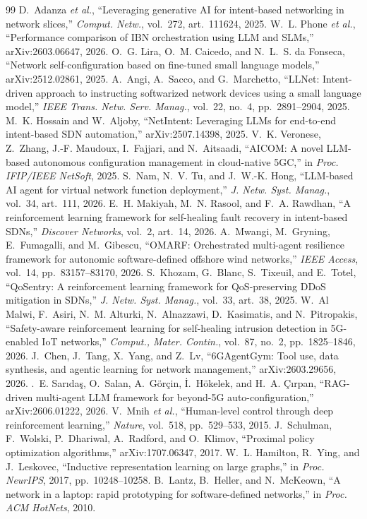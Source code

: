 \documentclass[sn-mathphys,Numbered]{sn-jnl}
\begin{document}
\begin{thebibliography}{99}
D.~Adanza \emph{et al.}, ``Leveraging generative AI for intent-based networking in network slices,'' \emph{Comput. Netw.}, vol.~272, art.~111624, 2025.
W.~L. Phone \emph{et al.}, ``Performance comparison of IBN orchestration using LLM and SLMs,'' arXiv:2603.06647, 2026.
O.~G. Lira, O.~M. Caicedo, and N.~L.~S. da Fonseca, ``Network self-configuration based on fine-tuned small language models,'' arXiv:2512.02861, 2025.
A.~Angi, A.~Sacco, and G.~Marchetto, ``LLNet: Intent-driven approach to instructing softwarized network devices using a small language model,'' \emph{IEEE Trans. Netw. Serv. Manag.}, vol.~22, no.~4, pp.~2891--2904, 2025.
M.~K. Hossain and W.~Aljoby, ``NetIntent: Leveraging LLMs for end-to-end intent-based SDN automation,'' arXiv:2507.14398, 2025.
V.~K. Veronese, Z.~Zhang, J.-F. Maudoux, I.~Fajjari, and N.~Aitsaadi, ``AICOM: A novel LLM-based autonomous configuration management in cloud-native 5GC,'' in \emph{Proc. IFIP/IEEE NetSoft}, 2025.
S.~Nam, N.~V. Tu, and J.~W.-K. Hong, ``LLM-based AI agent for virtual network function deployment,'' \emph{J. Netw. Syst. Manag.}, vol.~34, art.~111, 2026.
E.~H. Makiyah, M.~N. Rasool, and F.~A. Rawdhan, ``A reinforcement learning framework for self-healing fault recovery in intent-based SDNs,'' \emph{Discover Networks}, vol.~2, art.~14, 2026.
A.~Mwangi, M.~Gryning, E.~Fumagalli, and M.~Gibescu, ``OMARF: Orchestrated multi-agent resilience framework for autonomic software-defined offshore wind networks,'' \emph{IEEE Access}, vol.~14, pp.~83157--83170, 2026.
S.~Khozam, G.~Blanc, S.~Tixeuil, and E.~Totel, ``QoSentry: A reinforcement learning framework for QoS-preserving DDoS mitigation in SDNs,'' \emph{J. Netw. Syst. Manag.}, vol.~33, art.~38, 2025.
W.~Al Malwi, F.~Asiri, N.~M. Alturki, N.~Alnazzawi, D.~Kasimatis, and N.~Pitropakis, ``Safety-aware reinforcement learning for self-healing intrusion detection in 5G-enabled IoT networks,'' \emph{Comput., Mater. Contin.}, vol.~87, no.~2, pp.~1825--1846, 2026.
J.~Chen, J.~Tang, X.~Yang, and Z.~Lv, ``6GAgentGym: Tool use, data synthesis, and agentic learning for network management,'' arXiv:2603.29656, 2026.
.~E. Sar{\i}da{\c{s}}, O.~Salan, A.~G\"{o}r\c{c}in, {\.I}.~H\"{o}kelek, and H.~A. \c{C}{\i}rpan, ``RAG-driven multi-agent LLM framework for beyond-5G auto-configuration,'' arXiv:2606.01222, 2026.
V.~Mnih \emph{et al.}, ``Human-level control through deep reinforcement learning,'' \emph{Nature}, vol.~518, pp.~529--533, 2015.
J.~Schulman, F.~Wolski, P.~Dhariwal, A.~Radford, and O.~Klimov, ``Proximal policy optimization algorithms,'' arXiv:1707.06347, 2017.
W.~L. Hamilton, R.~Ying, and J.~Leskovec, ``Inductive representation learning on large graphs,'' in \emph{Proc. NeurIPS}, 2017, pp.~10248--10258.
B.~Lantz, B.~Heller, and N.~McKeown, ``A network in a laptop: rapid prototyping for software-defined networks,'' in \emph{Proc. ACM HotNets}, 2010.
\end{thebibliography}
\end{document}
